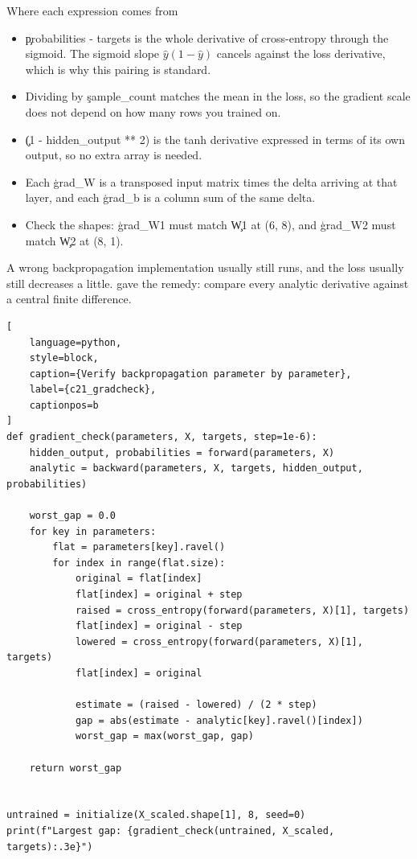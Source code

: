 \begin{SyntaxBox}{Where each expression comes from}
\begin{itemize}
    \item \c{probabilities - targets} is the whole derivative of cross-entropy
          through the sigmoid. The sigmoid slope
          $\hat{y}(1-\hat{y})$ cancels against the loss derivative, which is why
          this pairing is standard.
    \item Dividing by \c{sample_count} matches the mean in the loss, so the
          gradient scale does not depend on how many rows you trained on.
    \item \c{(1 - hidden_output ** 2)} is the tanh derivative expressed in terms
          of its own output, so no extra array is needed.
    \item Each \c{grad_W} is a transposed input matrix times the delta arriving
          at that layer, and each \c{grad_b} is a column sum of the same delta.
    \item Check the shapes: \c{grad_W1} must match \c{W1} at (6, 8), and
          \c{grad_W2} must match \c{W2} at (8, 1).
\end{itemize}
\end{SyntaxBox}


A wrong backpropagation implementation usually still runs, and the loss usually
still decreases a little.  gave the remedy: compare
every analytic derivative against a central finite difference.

\begin{lstlisting}[
    language=python,
    style=block,
    caption={Verify backpropagation parameter by parameter},
    label={c21_gradcheck},
    captionpos=b
]
def gradient_check(parameters, X, targets, step=1e-6):
    hidden_output, probabilities = forward(parameters, X)
    analytic = backward(parameters, X, targets, hidden_output, probabilities)

    worst_gap = 0.0
    for key in parameters:
        flat = parameters[key].ravel()
        for index in range(flat.size):
            original = flat[index]
            flat[index] = original + step
            raised = cross_entropy(forward(parameters, X)[1], targets)
            flat[index] = original - step
            lowered = cross_entropy(forward(parameters, X)[1], targets)
            flat[index] = original

            estimate = (raised - lowered) / (2 * step)
            gap = abs(estimate - analytic[key].ravel()[index])
            worst_gap = max(worst_gap, gap)

    return worst_gap


untrained = initialize(X_scaled.shape[1], 8, seed=0)
print(f"Largest gap: {gradient_check(untrained, X_scaled, targets):.3e}")
\end{lstlisting}

